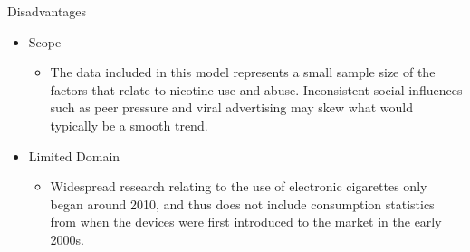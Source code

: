 Disadvantages
\begin{itemize}
    \item Scope
    \begin{itemize}
        \item The data included in this model represents a small sample size of the factors that relate to nicotine use and abuse. Inconsistent social influences such as peer pressure and viral advertising may skew what would typically be a smooth trend.
    \end{itemize}
    \item Limited Domain
    \begin{itemize}
        \item Widespread research relating to the use of electronic cigarettes only began around 2010, and thus does not include consumption statistics from when the devices were first introduced to the market in the early 2000s.
    \end{itemize}
\end{itemize}

